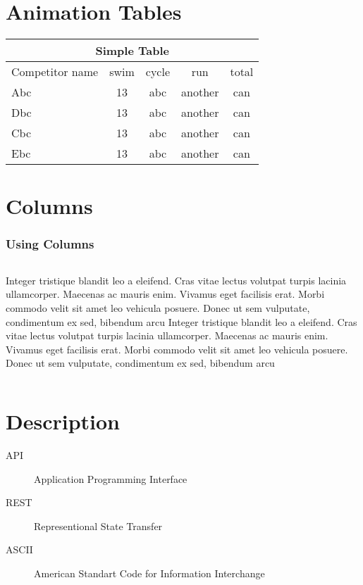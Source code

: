 \documentclass{beamer}
\begin{document}

\section{Animation Tables}
\begin{frame}
\begin{tabular}{| l | c | c | c | c |}
\hline
\multicolumn{5}{|c|}{Simple Table} \\
\hline
Competitor name & swim & cycle & run & total \\ 
\hline \hline
Abc & 13 & abc & another & can  \\
Dbc & 13 & abc & another & can  \\
Cbc & 13 & abc & another & can  \\
Ebc & 13 & abc & another & can  \\
\hline
\end{tabular}
\end{frame}

\section{Columns}
\begin{frame}
\frametitle{Using Columns}
\begin{columns}
Integer tristique blandit leo a eleifend. Cras vitae lectus volutpat turpis lacinia ullamcorper. Maecenas ac mauris enim. Vivamus eget facilisis erat. Morbi commodo velit sit amet leo vehicula posuere. Donec ut sem vulputate, condimentum ex sed, bibendum arcu
Integer tristique blandit leo a eleifend. Cras vitae lectus volutpat turpis lacinia ullamcorper. Maecenas ac mauris enim. Vivamus eget facilisis erat. Morbi commodo velit sit amet leo vehicula posuere. Donec ut sem vulputate, condimentum ex sed, bibendum arcu
\end{columns}
\end{frame}


\section{Description}
\begin{frame}
\begin{description}
    \item[API]  Application Programming Interface
    \item[REST] Representional State Transfer
    \item[ASCII] American Standart Code for Information Interchange
\end{description} 
\end{frame}
\end{document}
